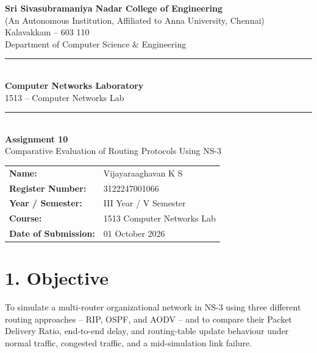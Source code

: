 \documentclass[11pt]{article}
\title{\vspace{-2cm}}
\date{}
\begin{document}
\begin{titlepage}
\centering
\vspace*{1cm}
{\large \textbf{Sri Sivasubramaniya Nadar College of Engineering}}\\
{\small (An Autonomous Institution, Affiliated to Anna University, Chennai)}\\
{\small Kalavakkam -- 603 110}\\[0.3cm]
{\small Department of Computer Science \& Engineering}\\[1.5cm]

\rule{\linewidth}{0.5mm}\\[0.4cm]
{\LARGE \textbf{Computer Networks Laboratory}}\\[0.3cm]
{\Large 1513 -- Computer Networks Lab}\\[0.4cm]
\rule{\linewidth}{0.5mm}\\[1.5cm]

{\huge \textbf{Assignment 10}}\\[0.4cm]
{\Large Comparative Evaluation of Routing Protocols Using NS-3}\\[2cm]

\begin{center}
\begin{tabular}{ll}
\textbf{Name:} & Vijayaraaghavan K S \\[0.2cm]
\textbf{Register Number:} & 3122247001066 \\[0.2cm]
\textbf{Year / Semester:} & III Year / V Semester \\[0.2cm]
\textbf{Course:} & 1513 Computer Networks Lab \\[0.2cm]
\textbf{Date of Submission:} & 01 October 2026 \\[0.2cm]
\end{tabular}
\end{center}

\vfill
\end{titlepage}

\section*{1. Objective}
To simulate a multi-router organizational network in NS-3 using three
different routing approaches -- RIP, OSPF, and AODV -- and to compare their
Packet Delivery Ratio, end-to-end delay, and routing-table update behaviour
under normal traffic, congested traffic, and a mid-simulation link failure.
\end{document}
